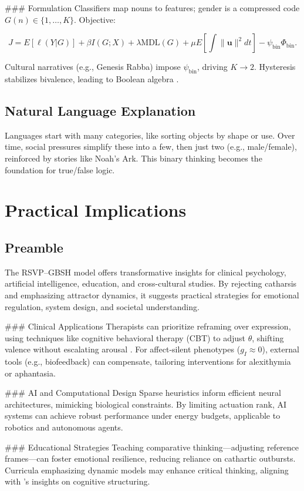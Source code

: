 \documentclass[11pt]{article}
\theoremstyle{plain}
\begin{document}
### Formulation
Classifiers map nouns to features; gender is a compressed code \(G(n) \in \{1, \dots, K\}\). Objective:

\[
J = E[\ell(Y|G)] + \beta I(G; X) + \lambda \text{MDL}(G) + \mu E[\int \|\mathbf{u}\|^2 dt] - \psi_{\text{bin}} \Phi_{\text{bin}}.
\]

Cultural narratives (e.g., Genesis Rabba) impose \(\psi_{\text{bin}}\), driving \(K \to 2\). Hysteresis stabilizes bivalence, leading to Boolean algebra \citep{GenesisRabbah, Boole1854}.

\subsection{Natural Language Explanation}
Languages start with many categories, like sorting objects by shape or use. Over time, social pressures simplify these into a few, then just two (e.g., male/female), reinforced by stories like Noah’s Ark. This binary thinking becomes the foundation for true/false logic.

\section{Practical Implications}

\subsection{Preamble}
The RSVP–GBSH model offers transformative insights for clinical psychology, artificial intelligence, education, and cross-cultural studies. By rejecting catharsis and emphasizing attractor dynamics, it suggests practical strategies for emotional regulation, system design, and societal understanding.

### Clinical Applications
Therapists can prioritize reframing over expression, using techniques like cognitive behavioral therapy (CBT) to adjust \(\theta\), shifting valence without escalating arousal \citep{Douglas1966}. For affect-silent phenotypes (\(g_I \approx 0\)), external tools (e.g., biofeedback) can compensate, tailoring interventions for alexithymia or aphantasia.

### AI and Computational Design
Sparse heuristics inform efficient neural architectures, mimicking biological constraints. By limiting actuation rank, AI systems can achieve robust performance under energy budgets, applicable to robotics and autonomous agents.

### Educational Strategies
Teaching comparative thinking—adjusting reference frames—can foster emotional resilience, reducing reliance on cathartic outbursts. Curricula emphasizing dynamic models may enhance critical thinking, aligning with \citet{Goody1977}’s insights on cognitive structuring.
\end{document}

